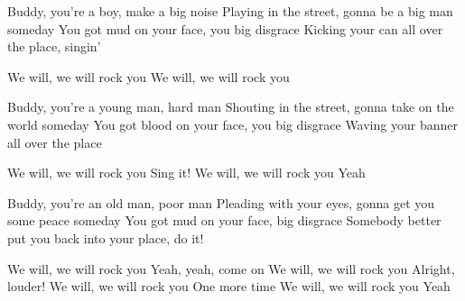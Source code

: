 \begin{verse*}
Buddy, you're a boy, make a big noise
Playing in the street, gonna be a big man someday
You got mud on your face, you big disgrace 
Kicking your can all over the place, singin'
\end{verse*}

\begin{verse*}
We will, we will rock you
We will, we will rock you
\end{verse*}

\begin{verse*}
Buddy, you're a young man, hard man
Shouting in the street, gonna take on the world someday
You got blood on your face, you big disgrace
Waving your banner all over the place
\end{verse*}

\begin{verse*}
We will, we will rock you
Sing it!
We will, we will rock you
Yeah
\end{verse*}

\begin{verse*}
Buddy, you're an old man, poor man
Pleading with your eyes, gonna get you some peace someday
You got mud on your face, big disgrace
Somebody better put you back into your place, do it!
\end{verse*}

\begin{verse*}
We will, we will rock you
Yeah, yeah, come on
We will, we will rock you
Alright, louder!
We will, we will rock you
One more time
We will, we will rock you
Yeah
\end{verse*}
